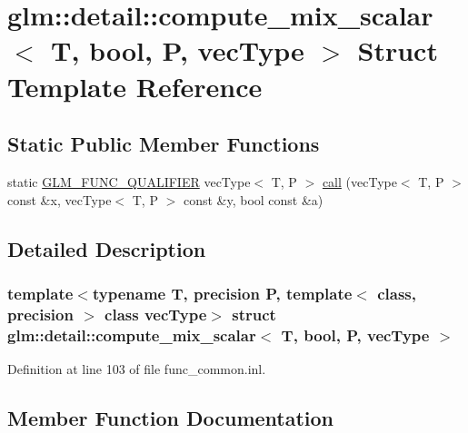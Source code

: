 \hypertarget{structglm_1_1detail_1_1compute__mix__scalar_3_01_t_00_01bool_00_01_p_00_01vec_type_01_4}{}\section{glm\+:\+:detail\+:\+:compute\+\_\+mix\+\_\+scalar$<$ T, bool, P, vec\+Type $>$ Struct Template Reference}
\label{structglm_1_1detail_1_1compute__mix__scalar_3_01_t_00_01bool_00_01_p_00_01vec_type_01_4}
\subsection*{Static Public Member Functions}
\begin{DoxyCompactItemize}
\item 
static \hyperlink{setup_8hpp_a33fdea6f91c5f834105f7415e2a64407}{G\+L\+M\+\_\+\+F\+U\+N\+C\+\_\+\+Q\+U\+A\+L\+I\+F\+I\+ER} vec\+Type$<$ T, P $>$ \hyperlink{structglm_1_1detail_1_1compute__mix__scalar_3_01_t_00_01bool_00_01_p_00_01vec_type_01_4_a32b46dd2110b41d9c7b98fc90b9a88b1}{call} (vec\+Type$<$ T, P $>$ const \&x, vec\+Type$<$ T, P $>$ const \&y, bool const \&a)
\end{DoxyCompactItemize}


\subsection{Detailed Description}
\subsubsection*{template$<$typename T, precision P, template$<$ class, precision $>$ class vec\+Type$>$\newline
struct glm\+::detail\+::compute\+\_\+mix\+\_\+scalar$<$ T, bool, P, vec\+Type $>$}



Definition at line 103 of file func\+\_\+common.\+inl.



\subsection{Member Function Documentation}
\mbox{\label{structglm_1_1detail_1_1compute__mix__scalar_3_01_t_00_01bool_00_01_p_00_01vec_type_01_4_a32b46dd2110b41d9c7b98fc90b9a88b1}} 

